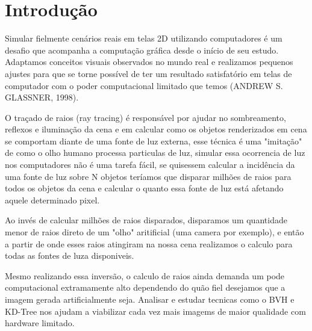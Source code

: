 \documentclass[
    12pt,                %
    openright,           %
    oneside,             %
    a4paper,             %
    english,             %
    brazil               %
]{abntex2}
\begin{document}

\tableofcontents*
\cleardoublepage

\textual

\chapter{Introdução}
\label{cap:introducao}

Simular fielmente cenários reais em telas 2D utilizando computadores é um desafio que acompanha a computação gráfica desde o início de seu estudo. 
Adaptamos conceitos visuais observados no mundo real e realizamos pequenos ajustes para que se torne possível de ter um resultado satisfatório em telas de computador com o poder computacional limitado que temos (ANDREW S. GLASSNER, 1998).

O traçado de raios (ray tracing) é responsável por ajudar no sombreamento, reflexos e iluminação da cena e em calcular como os objetos renderizados em cena se comportam diante de uma fonte de luz externa, esse técnica é uma "imitação" de como o olho humano processa particulas de luz, simular essa ocorrencia de luz nos computadores não é uma tarefa fácil, se quisessem calcular a incidência da uma fonte de luz sobre N objetos teríamos que disparar milhões de raios para todos os objetos da cena e calcular o quanto essa fonte de luz está afetando aquele determinado pixel.

Ao invés de calcular milhões de raios disparados, disparamos um quantidade menor de raios direto de um "olho" aritificial (uma camera por exemplo), e então a partir de onde esses raios atingiram na nossa cena realizamos o calculo para todas as fontes de luza disponiveis.

Mesmo realizando essa inversão, o calculo de raios ainda demanda um pode computacional extramamente alto dependendo do quão fiel desejamos que a imagem gerada artificialmente seja. Analisar e estudar tecnicas como o BVH e KD-Tree nos ajudam a viabilizar cada vez mais imagems de maior qualidade com hardware limitado.
\end{document}

